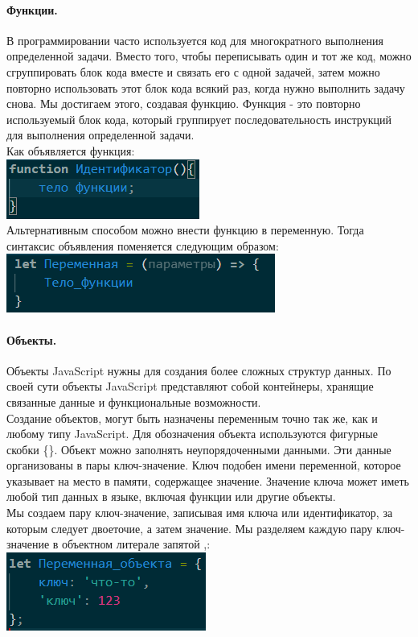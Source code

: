 \documentclass[14pt,Diplom]{diplomwork}
\begin{document}
\paragraph{Функции.}
 В программировании часто используется код для многократного выполнения определенной задачи. Вместо того, чтобы переписывать один и тот же код, можно сгруппировать блок кода вместе и связать его с одной задачей, затем можно повторно использовать этот блок кода всякий раз, когда нужно выполнить задачу снова. Мы достигаем этого, создавая функцию. Функция - это повторно используемый блок кода, который группирует последовательность инструкций для выполнения определенной задачи.\\
 
 Как объявляется функция:\\
 \includegraphics[width=0.5\linewidth]{2.png}\\
 Альтернативным способом можно внести функцию в переменную. Тогда синтаксис объявления поменяется следующим образом:
 \includegraphics[width=0.5\linewidth]{3.png}\\
  
\paragraph{Объекты.}
Объекты JavaScript нужны для создания более сложных структур данных. По своей сути объекты JavaScript представляют собой контейнеры, хранящие связанные данные и функциональные возможности.\\

Создание объектов, могут быть назначены переменным точно так же, как и любому типу JavaScript. Для обозначения объекта используются фигурные скобки \{\}. Объект можно заполнять неупорядоченными данными. Эти данные организованы в пары ключ-значение. Ключ подобен имени переменной, которое указывает на место в памяти, содержащее значение. Значение ключа может иметь любой тип данных в языке, включая функции или другие объекты.\\

Мы создаем пару ключ-значение, записывая имя ключа или идентификатор, за которым следует двоеточие, а затем значение. Мы разделяем каждую пару ключ-значение в объектном литерале запятой ,:
\includegraphics[width=0.5\linewidth]{4.png}\\
\end{document}
